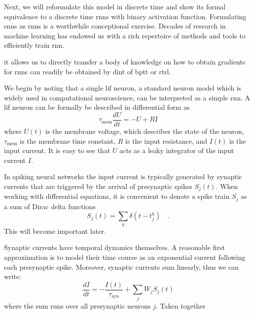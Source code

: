 \documentclass[journal,onecolumn,11pt]{IEEEtran}
\begin{document}
Next, we will reformulate this model in discrete time and show its formal equivalence to a discrete time \glspl{rnn} with binary activation function. 
Formulating \glspl{snn} as \glspl{rnn} is a worthwhile conceptional exercise. 
Decades of research in machine learning has endowed us with a rich repertoire of methods and tools to efficiently train \gls{rnn}.


it allows us to directly transfer a body of knowledge on how to obtain gradients for \glspl{rnn} can readily be obtained by dint of \gls{bptt} or \gls{rtrl}. %


We begin by noting that a single \gls{lif} neuron, a standard neuron model which is widely used in computational neuroscience, can be interpreted as a simple \gls{rnn}. 
A \gls{lif} neuron can be formally be described in differential form as
\begin{equation}
    \tau_\mathrm{mem} \frac{dU}{dt} = -U + RI
\end{equation}
where $U(t)$ is the membrane voltage, which describes the state of the neuron, $\tau_\mathrm{mem}$ is the membrane time constant, $R$ is the input resistance, and $I(t)$ is the input current.
It is easy to see that $U$ acts as a leaky integrator of the input current $I$.

In spiking neural networks the input current is typically generated by synaptic currents that are triggered by the arrival of presynaptic spikes $S_j(t)$.
When working with differential equations, it is convenient to denote a spike train $S_j$ as a sum of Dirac delta functions
$$S_j(t)=\sum_k \delta(t-t_j^k) \quad .$$
This will become important later.

Synaptic currents have temporal dynamics themselves. A reasonable first approximation is to model their time course as an exponential current following each presynaptic spike. Moreover, synaptic currents sum linearly, thus we can write:
\begin{equation}
    \frac{dI}{dt}= -\frac{I(t)}{\tau_\mathrm{syn}} + \sum_j W_j S_j(t)
\end{equation}
where the sum runs over all presynaptic neurons $j$.
Taken together 

\end{document}
